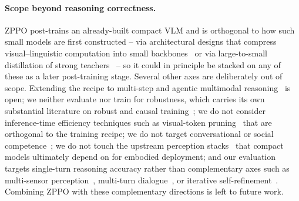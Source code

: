 \paragraph{Scope beyond reasoning correctness.}
ZPPO post-trains an already-built compact VLM and is orthogonal to how such small models are first constructed -- via architectural designs that compress visual--linguistic computation into small backbones~\citep{lee-etal-2024-collavo,10.1007/978-3-031-72967-6_16,NEURIPS2024_473a9a75,lee-etal-2024-trol,lee2024phantom} or via large-to-small distillation of strong teachers~\citep{lee2025genrecal,lee2025building,yu2026hide} -- so it could in principle be stacked on any of these as a later post-training stage. Several other axes are deliberately out of scope. Extending the recipe to multi-step and agentic multimodal reasoning~\citep{Lee_2026_CVPR_Recursive,kang2026agent,cho2026spatialclawrethinkingactioninterface} is open; we neither evaluate nor train for robustness, which carries its own substantial literature on robust and causal training~\citep{lee2021towards,NEURIPS2021_8e5e15c4,Lee_2022_CVPR,Kim_2023_CVPR,Lee_2023_ICCV}; we do not consider inference-time efficiency techniques such as visual-token pruning~\citep{kim2026and} that are orthogonal to the training recipe; we do not target conversational or social competence~\citep{leeenhancing}; we do not touch the upstream perception stacks~\citep{lee2020training} that compact models ultimately depend on for embodied deployment; and our evaluation targets single-turn reasoning accuracy rather than complementary axes such as multi-sensor perception~\citep{yu2024spark}, multi-turn dialogue~\citep{Lee_2025_ICCV}, or iterative self-refinement~\citep{lee2026refinebench}. Combining ZPPO with these complementary directions is left to future work.




